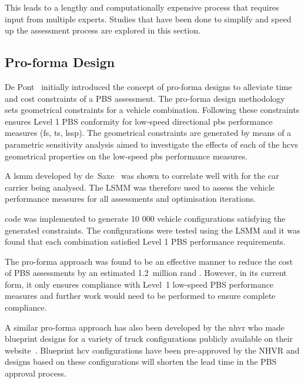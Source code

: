 This leads to a lengthy and computationally expensive process that requires input from multiple experts. Studies that have been done to simplify and speed up the assessment process are explored in this section.

\subsection{Pro-forma Design}\label{section:pro-forma-design}

  De Pont~\cite{Pont2010} initially introduced the concept of pro-forma designs to alleviate time and cost constraints of a PBS assessment. The pro-forma design methodology sets geometrical constraints for a vehicle combination. Following these constraints ensures Level 1 PBS conformity for low-speed directional \gls{pbs} performance measures (\gls{fs}, \gls{ts}, \gls{lssp}). The geometrical constraints are generated by means of a parametric sensitivity analysis aimed to investigate the effects of each of the \glspl{hcv} geometrical properties on the low-speed \gls{pbs} performance measures.
  
  A \gls{lsmm} developed by de~Saxe~\cite{Benade2015} was shown to correlate well with \trucksim{} for the car carrier being analysed. The LSMM was therefore used to assess the vehicle performance measures for all assessments and optimisation iterations.

  \matlab{} code was implemented to generate 10 000 vehicle configurations satisfying the generated constraints. The configurations were tested using the LSMM and it was found that each combination satisfied Level 1 PBS performance requirements.

  The pro-forma approach was found to be an effective manner to reduce the cost of PBS assessments by an estimated 1.2~million rand \cite{Benade2015}. However, in its current form, it only ensures compliance with Level~1 low-speed PBS performance measures and further work would need to be performed to ensure complete compliance.

  A similar pro-forma approach has also been developed by the \gls{nhvr} who made blueprint designs for a variety of truck configurations publicly available on their website~\cite{NationalHeavyVehicleRegulator}. Blueprint \gls{hcv} configurations have been pre-approved by the NHVR and designs based on these configurations will shorten the lead time in the PBS approval process.


